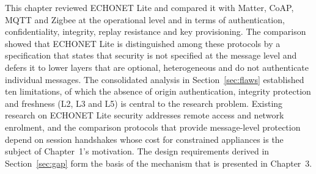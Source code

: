 This chapter reviewed ECHONET Lite and compared it with Matter, CoAP, MQTT and Zigbee at the operational level and in terms of authentication, confidentiality, integrity, replay resistance and key provisioning. The comparison showed that ECHONET Lite is distinguished among these protocols by a specification that states that security is not specified at the message level and defers it to lower layers that are optional, heterogeneous and do not authenticate individual messages. The consolidated analysis in Section~\ref{sec:flaws} established ten limitations, of which the absence of origin authentication, integrity protection and freshness (L2, L3 and L5) is central to the research problem. Existing research on ECHONET Lite security addresses remote access and network enrolment, and the comparison protocols that provide message-level protection depend on session handshakes whose cost for constrained appliances is the subject of Chapter~1's motivation. The design requirements derived in Section~\ref{sec:gap} form the basis of the mechanism that is presented in Chapter~3.








